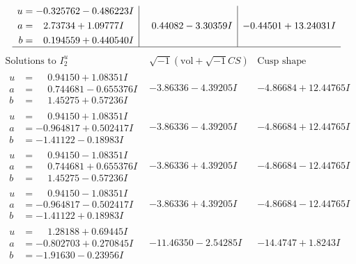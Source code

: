 \documentclass[1p]{elsarticle_modified}
\theoremstyle{definition}
\newcommand{\I}{\sqrt{-1}}
\begin{document}
$$\begin{array}{c|c|c}
\begin{aligned}
u &= -0.325762 - 0.486223 I \\
a &= \phantom{-}2.73734 + 1.09777 I \\
b &= \phantom{-}0.194559 + 0.440540 I\end{aligned}
 & \phantom{-}0.44082 - 3.30359 I & -0.44501 + 13.24031 I\\
 \hline 
 \end{array}$$\newpage$$\begin{array}{c|c|c}  
\text{Solutions to }I^u_{2}& \I (\text{vol} + \sqrt{-1}CS) & \text{Cusp shape}\\
 \hline 
\begin{aligned}
u &= \phantom{-}0.94150 + 1.08351 I \\
a &= \phantom{-}0.744681 - 0.655376 I \\
b &= \phantom{-}1.45275 + 0.57236 I\end{aligned}
 & -3.86336 - 4.39205 I & -4.86684 + 12.44765 I \\ \hline\begin{aligned}
u &= \phantom{-}0.94150 + 1.08351 I \\
a &= -0.964817 + 0.502417 I \\
b &= -1.41122 - 0.18983 I\end{aligned}
 & -3.86336 - 4.39205 I & -4.86684 + 12.44765 I \\ \hline\begin{aligned}
u &= \phantom{-}0.94150 - 1.08351 I \\
a &= \phantom{-}0.744681 + 0.655376 I \\
b &= \phantom{-}1.45275 - 0.57236 I\end{aligned}
 & -3.86336 + 4.39205 I & -4.86684 - 12.44765 I \\ \hline\begin{aligned}
u &= \phantom{-}0.94150 - 1.08351 I \\
a &= -0.964817 - 0.502417 I \\
b &= -1.41122 + 0.18983 I\end{aligned}
 & -3.86336 + 4.39205 I & -4.86684 - 12.44765 I \\ \hline\begin{aligned}
u &= \phantom{-}1.28188 + 0.69445 I \\
a &= -0.802703 + 0.270845 I \\
b &= -1.91630 - 0.23956 I\end{aligned}
 & -11.46350 - 2.54285 I & -14.4747 + 1.8243 I \\ \hline\begin{aligned}

\end{aligned}
\end{array}$$
\end{document}
